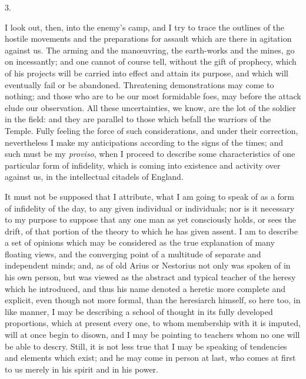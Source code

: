 3.

I look out, then, into the enemy's camp, and I try to trace the
outlines of the hostile movements and the preparations for assault
which are there in agitation against us. The arming and the manœuvring,
the earth-works and the mines, go on incessantly; and one cannot of
course tell, without the gift of prophecy, which of his projects will
be carried into effect and attain its purpose, and which will
eventually fail or be abandoned. Threatening demonstrations may come
to nothing; and those who are to be our most formidable foes, may
before the attack elude our observation. All these uncertainties, we
know, are the lot of the soldier in the field: and they are parallel
to those which befall the warriors of the Temple. Fully feeling the
force of such considerations, and under their correction, nevertheless
I make my anticipations according to the signs of the times; and such
must be my \emph{proviso}, when I proceed to describe some
characteristics of one particular form of infidelity, which is coming
into existence and activity over against us, in the intellectual
citadels of England.

It must not be supposed that I attribute, what I am going to speak
of as a form of infidelity of the day, to any given individual or
individuals; nor is it necessary to my purpose to suppose that any one
man as yet consciously holds, or sees the drift, of that portion of
the theory to which he has given assent. I am to describe a set of
opinions which may be considered as the true explanation of many
floating views, and the converging point of a multitude of separate
and independent minds; and, as of old Arius or Nestorius not only was
spoken of in his own person, but was viewed as the abstract and
typical teacher of the heresy which he introduced, and thus his name
denoted a heretic more complete and explicit, even though not more
formal, than the heresiarch himself, so here too, in like manner, I
may be describing a school of thought in its fully developed
proportions, which at present every one, to whom membership with it is
imputed, will at once begin to disown, and I may be pointing to
teachers whom no one will be able to descry. Still, it is not less
true that I may be speaking of tendencies and elements which exist;
and he may come in person at last, who comes at first to us
merely in his spirit and in his power.

